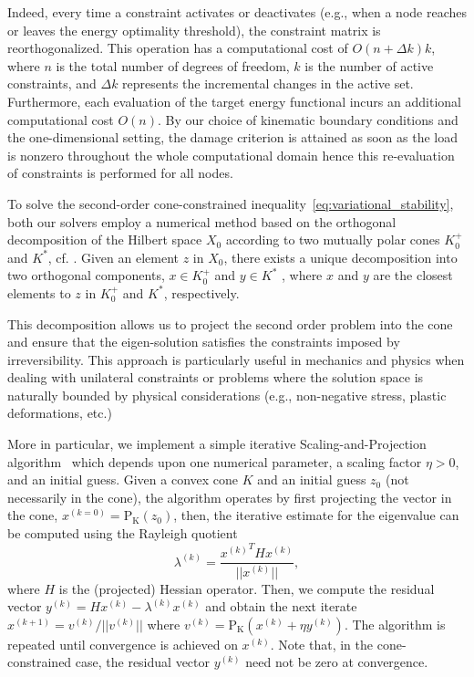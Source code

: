 \documentclass[10pt]{article}
\begin{document}
{        Indeed, every time a constraint activates or deactivates (e.g., when a node reaches or leaves the energy optimality threshold), the constraint matrix is reorthogonalized.
        This operation has a computational cost of $O(n+\Delta k)k$, where $n$ is the total number of degrees of freedom, $k$ is the number of active constraints, and $\Delta k$ represents the incremental changes in the active set.
        Furthermore, each evaluation of the target energy functional incurs an additional computational cost $O(n)$.
        By our choice of kinematic boundary conditions
        and the one-dimensional setting, the damage criterion is attained as soon as the load is nonzero throughout the whole computational domain hence this re-evaluation of constraints is performed for all nodes.
    }

To solve the second-order cone-constrained inequality~\eqref{eq:variational_stability}, {both our solvers} employ a numerical method based on the orthogonal decomposition of the Hilbert space  $X_0$  according to two mutually polar cones  $K^+_0$  and  $K^*$, cf. \cite{Moreau1962-fz}. Given an element  $z$  in  $X_0$, there exists a unique decomposition into two orthogonal components,  $x \in K^+_0$  and  $y \in K^*$ , where  $x$  and  $y$  are the closest elements to  $z$ in  $K^+_0$  and  $K^*$, respectively.

This decomposition allows us to project the second order problem into the cone and ensure that the eigen-solution satisfies the constraints imposed by irreversibility. This approach is particularly useful in mechanics and physics when dealing with unilateral constraints or problems where the solution space is naturally bounded by physical considerations (e.g., non-negative stress, plastic deformations, etc.)

More in particular, we implement a simple iterative Scaling-and-Projection algorithm~\cite{Pinto_da_Costa2010-qv} which depends upon one numerical parameter, a scaling factor $\eta>0$, {and an initial guess}. Given a convex cone  $K$ and an initial guess $z_0$ (not necessarily in the cone), the algorithm operates by first projecting the vector in the cone, $x^{(k=0)}= \operatorname{P_K}(z_0)$, then, the iterative estimate for the eigenvalue can be computed using the Rayleigh quotient
\begin{equation}
    \lambda^{(k)} = \frac{{x^{(k)}}^T H x^{(k)}}{||x^{(k)}||},
\end{equation}
where $H$ is the {(projected)} Hessian operator. Then, we compute the residual vector $y^{(k)} = H x^{(k)} - \lambda^{(k)} x^{(k)}$ and obtain the next iterate $x^{(k+1)} = v^{(k)}/||v^{(k)}||$ where
$v^{(k)} =\operatorname{P_K} (x^{(k)} + \eta y^{(k)})$.
The algorithm is repeated until convergence is achieved {on $x^{(k)}$}. Note that, in the cone-constrained case, the residual vector $y^{(k)}$ need not be zero at convergence.
\end{document}
